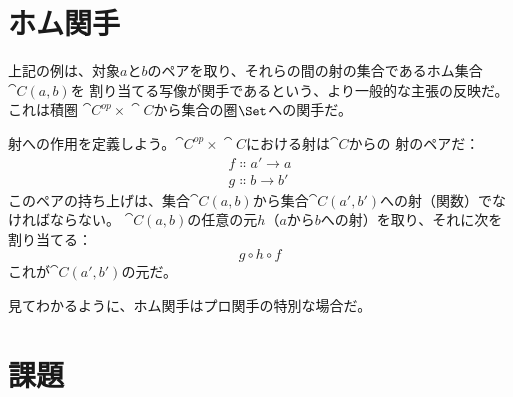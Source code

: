 \section{ホム関手}

上記の例は、対象$a$と$b$のペアを取り、それらの間の射の集合であるホム集合$\cat{C}(a, b)$を
割り当てる写像が関手であるという、より一般的な主張の反映だ。これは積圏
$\cat{C}^\mathit{op}\times{}\cat{C}$から集合の圏$\Set$への関手だ。

射への作用を定義しよう。$\cat{C}^\mathit{op}\times{}\cat{C}$における射は$\cat{C}$からの
射のペアだ：
\begin{gather*}
  f \Colon a' \to a \\
  g \Colon b \to b'
\end{gather*}
このペアの持ち上げは、集合$\cat{C}(a, b)$から集合$\cat{C}(a', b')$への射（関数）でなければならない。
$\cat{C}(a, b)$の任意の元$h$（$a$から$b$への射）を取り、それに次を割り当てる：
\[g \circ h \circ f\]
これが$\cat{C}(a', b')$の元だ。

見てわかるように、ホム関手はプロ関手の特別な場合だ。

\section{課題}

